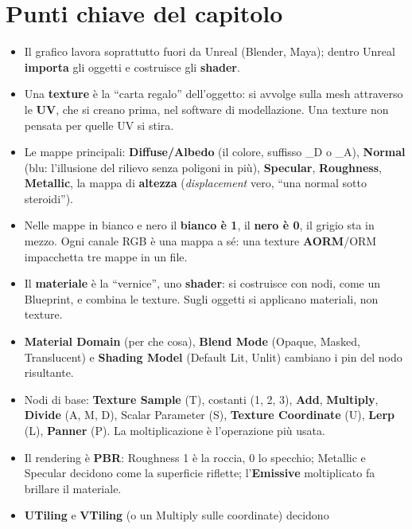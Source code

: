 \section*{Punti chiave del capitolo}

\begin{itemize}
  \item Il grafico lavora soprattutto fuori da Unreal (Blender, Maya); dentro Unreal
        \textbf{importa} gli oggetti e costruisce gli \textbf{shader}.
  \item Una \textbf{texture} è la ``carta regalo'' dell'oggetto: si avvolge sulla mesh
        attraverso le \textbf{UV}, che si creano prima, nel software di modellazione.
        Una texture non pensata per quelle UV si stira.
  \item Le mappe principali: \textbf{Diffuse/Albedo} (il colore, suffisso \_D o \_A),
        \textbf{Normal} (blu: l'illusione del rilievo senza poligoni in più),
        \textbf{Specular}, \textbf{Roughness}, \textbf{Metallic}, la mappa di
        \textbf{altezza} (\emph{displacement} vero, ``una normal sotto steroidi'').
  \item Nelle mappe in bianco e nero il \textbf{bianco è 1}, il \textbf{nero è 0}, il
        grigio sta in mezzo. Ogni canale RGB è una mappa a sé: una texture
        \textbf{AORM}/ORM impacchetta tre mappe in un file.
  \item Il \textbf{materiale} è la ``vernice'', uno \textbf{shader}: si costruisce con
        nodi, come un Blueprint, e combina le texture. Sugli oggetti si applicano
        materiali, non texture.
  \item \textbf{Material Domain} (per che cosa), \textbf{Blend Mode} (Opaque, Masked,
        Translucent) e \textbf{Shading Model} (Default Lit, Unlit) cambiano i pin del
        nodo risultante.
  \item Nodi di base: \textbf{Texture Sample} (T), costanti (1, 2, 3), \textbf{Add},
        \textbf{Multiply}, \textbf{Divide} (A, M, D), Scalar Parameter (S),
        \textbf{Texture Coordinate} (U), \textbf{Lerp} (L), \textbf{Panner} (P). La
        moltiplicazione è l'operazione più usata.
  \item Il rendering è \textbf{PBR}: Roughness 1 è la roccia, 0 lo specchio; Metallic
        e Specular decidono come la superficie riflette; l'\textbf{Emissive}
        moltiplicato fa brillare il materiale.
  \item \textbf{UTiling} e \textbf{VTiling} (o un Multiply sulle coordinate) decidono

\end{itemize}
